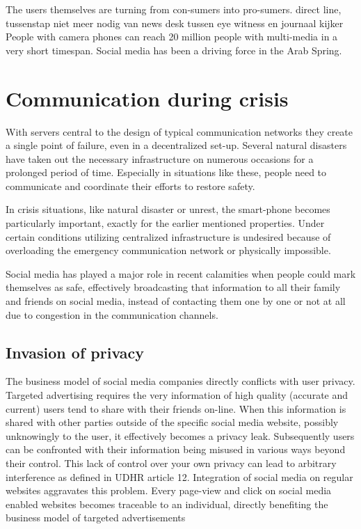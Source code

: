 The users themselves are turning from con-sumers into pro-sumers.
direct line, tussenstap niet meer nodig van news desk tussen eye witness en journaal kijker
People with camera phones can reach 20 million people with multi-media in a very short timespan.
Social media has been a driving force in the Arab Spring.



\section{Communication during crisis}
With servers central to the design of typical communication networks they create a single point of failure, even in a decentralized set-up.
Several natural disasters have taken out the necessary infrastructure on numerous occasions for a prolonged period of time.
Especially in situations like these, people need to communicate and coordinate their efforts to restore safety.

In crisis situations, like natural disaster or unrest, the smart-phone becomes particularly important, exactly for the earlier mentioned properties.
Under certain conditions utilizing centralized infrastructure is undesired because of overloading the emergency communication network or physically impossible.

Social media has played a major role in recent calamities when people could mark themselves as safe, effectively broadcasting that information to all their family and friends on social media, instead of contacting them one by one or not at all due to congestion in the communication channels.


\subsection{Invasion of privacy}
The business model of social media companies directly conflicts with user privacy.
Targeted advertising requires the very information of high quality (accurate and current) users tend to share with their friends on-line.
When this information is shared with other parties outside of the specific social media website, possibly unknowingly to the user, it effectively becomes a privacy leak.
Subsequently users can be confronted with their information being misused in various ways beyond their control.
This lack of control over your own privacy can lead to arbitrary interference as defined in UDHR article 12. %
Integration of social media on regular websites aggravates this problem.
Every page-view and click on social media enabled websites becomes traceable to an individual, directly benefiting the business model of targeted advertisements

